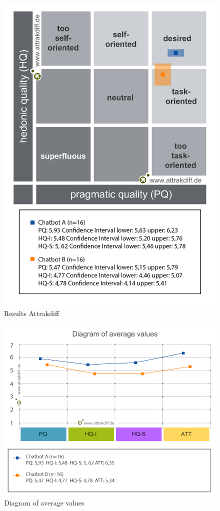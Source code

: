 \begin{figure}[h]
    \centering
    \includegraphics[scale=0.33]{figures/Portfolio-of-results-attrakdiff.png}
    \caption{Results Attrakdiff}
    \label{fig:portres}
\end{figure}

\begin{figure}[h]
    \centering
    \includegraphics[scale=0.5]{figures/Diagram-of-average-values.png}
    \caption{Diagram of average values}
    \label{fig:diagval}
\end{figure}

